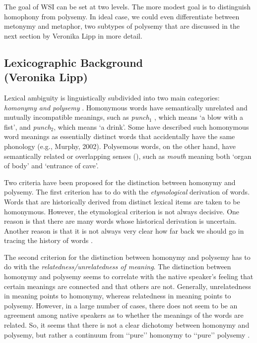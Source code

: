 \documentclass[11pt]{article}
\begin{document}
The goal of WSI can be set at two levels. The more modest goal  is to
distinguish homophony from polysemy. In ideal case, we could even differentiate
between metonymy and metaphor, two subtypes of polysemy that are discussed in
the next section 
by Veronika Lipp in more detail.


\subsection{Lexicographic Background \\ (Veronika Lipp)}

\label{sec:bground}

Lexical ambiguity is linguistically subdivided into two main categories:
\emph{homonymy and polysemy} \citep{Cruse:2004}. Homonymous words have
semantically unrelated and mutually incompatible meanings, such as
\emph{punch$_1$} , which means `a blow with a fist', and \emph{punch$_2$},
which means `a drink'. Some have described such homonymous word meanings as
essentially distinct words that accidentally have the same phonology (e.g.,
Murphy, 2002). Polysemous words, on the other hand, have semantically related
or overlapping senses (\cite{Cruse:2004,Jackendoff:2002, Pustejovsky:1995}),
such as \emph{mouth} meaning both `organ of body' and `entrance of cave'.

Two criteria have been proposed for the distinction between homonymy and
polysemy. The first criterion has to do with the \emph{etymological} derivation
of words. Words that are historically derived from distinct lexical items are
taken to be homonymous. However, the etymological criterion is not always
decisive. One reason is that there are many words whose historical derivation
is uncertain. Another reason is that it is not always very clear how far back
we should go in tracing the history of words \citep{Lyons:1977}.

The second criterion for the distinction between homonymy and polysemy has to
do with the \emph{relatedness/unrelatedness of meaning}.  The distinction
between homonymy and polysemy seems to correlate with the native speaker’s
feeling that certain meanings are connected and that others are not. Generally,
unrelatedness in meaning points to homonymy, whereas relatedness in meaning
points to polysemy.  However, in a large number of cases, there does not seem
to be an agreement among native speakers as to whether the meanings of the
words are related. So, it seems that there is not a clear dichotomy between
homonymy and polysemy, but rather a continuum from ‘‘pure’’ homonymy to
‘‘pure’’ polysemy \citep{Lyons:1977}.
\end{document}
